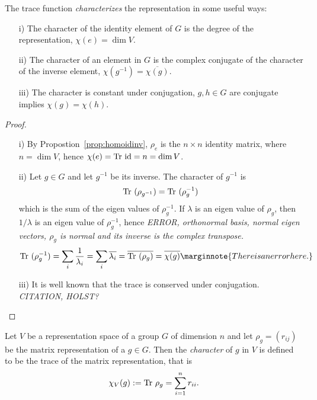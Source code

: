 \begin{proposition}\cite[Prop.2.1.]{Serre}
	The trace function \emph{characterizes} the representation in some useful ways:
	\begin{enumerate}
		\item[i)] The character of the identity element of $G$ is the degree of the representation, $\chi(e) = \dim V$.
		\item[ii)] The character of an element in $G$ is the complex conjugate of the character of the inverse element, $\chi(g^{-1}) = \overline{\chi(g)}$.
		\item[iii)] The character is constant under conjugation, $g,h\in G$ are conjugate implies $\chi(g) = \chi(h)$.
	\end{enumerate}
\end{proposition}
\begin{proof}
	\begin{enumerate}
		\item[i)] By Propostion~\ref{prop:homoidinv}, $\rho_e$ is the $n \times n$ identity matrix, where $n = \dim V$, hence $\chi(e) = \text{Tr } \text{id} = n = \dim V$.
		\item[ii)] Let $g \in G$ and let $g^{-1}$ be its inverse. The character of $g^{-1}$ is 
		\begin{align*}
			\text{Tr }(\rho_{g^{-1}}) = \text{Tr }(\rho_g^{-1})
		\end{align*}
		which is the sum of the eigen values of $\rho_g^{-1}$. If $\lambda$ is an eigen value of $\rho_g$, then $1/\lambda$ is an eigen value of $\rho_g^{-1}$, hence \textit{ERROR, orthonormal basis, normal eigen vectors, $\rho_g$ is normal and its inverse is the complex transpose.}
		\begin{align*}
			\Tr(\rho_g^{-1}) = \sum_i \frac{1}{\lambda_i} = \sum_i \overline{\lambda_i} = \overline{\Tr(\rho_g)} = \overline{\chi(g)} \marginnote{There is an error here.}
		\end{align*} 
		\item[iii)] It is well known that the trace is conserved under conjugation. \textit{CITATION, HOLST?} \qedhere
	\end{enumerate}
\end{proof}


\begin{definition}\label{def:char}
	Let $V$ be a representation space of a group $G$ of dimension $n$ and let $\rho_g = (r_{ij})$ be the matrix representation of a $g \in G$. Then the \emph{character} of $g$ in $V$ is defined to be the trace of the matrix representation, that is 
	\begin{align*}
		\chi_V(g) := \text{Tr } \rho_g = \sum_{i=1}^{n} r_{ii}.
	\end{align*}
\end{definition}


